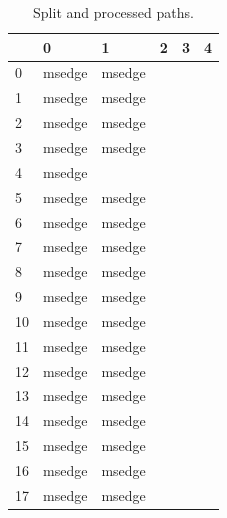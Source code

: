 \documentclass[a4paper,twoside,12pt]{book}
\begin{document}
\begin{appendices}
\begin{table}
	\centering
	\caption{Split and processed paths.}
	\label{id:tab:splitPaths}
	\begin{tabular}{llllll}
		\toprule
		{} &       0 &              1 &              2 &              3 &              4 \\
		\midrule
		0   &  msedge &         msedge &                &                &                \\
		1   &  msedge &         msedge &                &                &                \\
		2   &  msedge &         msedge &                &                &                \\
		3   &  msedge &         msedge &                &                &                \\
		4   &  msedge &                &                &                &                \\
		5   &  msedge &         msedge &                &                &                \\
		6   &  msedge &         msedge &                &                &                \\
		7   &  msedge &         msedge &                &                &                \\
		8   &  msedge &         msedge &                &                &                \\
		9   &  msedge &         msedge &                &                &                \\
		10  &  msedge &         msedge &                &                &                \\
		11  &  msedge &         msedge &                &                &                \\
		12  &  msedge &         msedge &                &                &                \\
		13  &  msedge &         msedge &                &                &                \\
		14  &  msedge &         msedge &                &                &                \\
		15  &  msedge &         msedge &                &                &                \\
		16  &  msedge &         msedge &                &                &                \\
		17  &  msedge &         msedge &                &                &                \\

\end{tabular}
\end{table}
\end{appendices}
\end{document}
